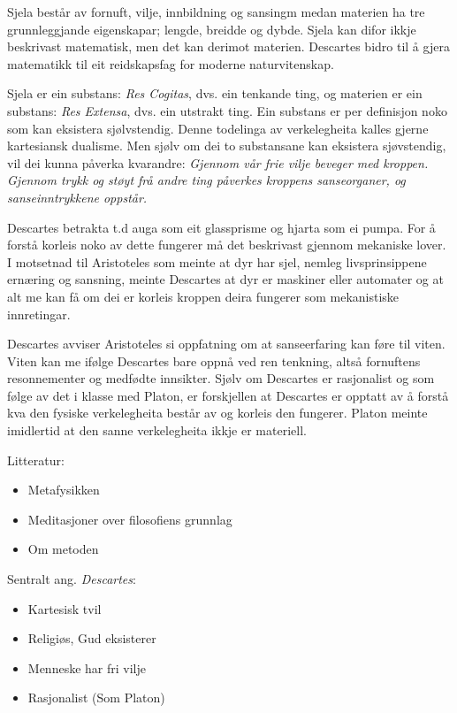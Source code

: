\documentclass[a4paper]{IEEEtran}
\begin{document}
Sjela består av fornuft, vilje, innbildning og sansingm medan materien ha tre grunnleggjande eigenskapar; lengde, breidde og dybde. Sjela kan difor ikkje beskrivast matematisk, men det kan derimot materien. Descartes bidro til å gjera matematikk til eit reidskapsfag for moderne naturvitenskap.\bigskip

Sjela er ein substans: \textit{Res Cogitas}, dvs. ein tenkande ting, og materien er ein substans: \textit{Res Extensa}, dvs. ein utstrakt ting. Ein substans er per definisjon noko som kan eksistera sjølvstendig. Denne todelinga av verkelegheita kalles gjerne kartesiansk dualisme. Men sjølv om dei to substansane kan eksistera sjøvstendig, vil dei kunna påverka kvarandre: \textit{Gjennom vår frie vilje beveger med kroppen. Gjennom trykk og støyt frå andre ting påverkes kroppens sanseorganer, og sanseinntrykkene oppstår.}\bigskip

Descartes betrakta t.d auga som eit glassprisme og hjarta som ei pumpa. For å forstå korleis noko av dette fungerer må det beskrivast gjennom mekaniske lover. I motsetnad til Aristoteles som meinte at dyr har sjel, nemleg livsprinsippene ernæring og sansning, meinte Descartes at dyr er maskiner eller automater og at alt me kan få om dei er korleis kroppen deira fungerer som mekanistiske innretingar.\bigskip

Descartes avviser Aristoteles si oppfatning om at sanseerfaring kan føre til viten. Viten kan me ifølge Descartes bare oppnå ved ren tenkning, altså fornuftens resonnementer og medfødte innsikter. Sjølv om Descartes er rasjonalist og som følge av det i klasse med Platon, er forskjellen at Descartes er opptatt av å forstå kva den fysiske verkelegheita består av og korleis den fungerer. Platon meinte imidlertid at den sanne verkelegheita ikkje er materiell.\bigskip

\begin{center}
Litteratur:
\end{center}
\begin{itemize}
    \item Metafysikken
    \item Meditasjoner over filosofiens grunnlag
    \item Om metoden
\end{itemize}\bigskip 

\begin{center}
Sentralt ang. \textit{Descartes}:
\end{center}
\begin{itemize}\bigskip
    \item Kartesisk tvil
    \item Religiøs, Gud eksisterer
    \item Menneske har fri vilje
    \item Rasjonalist (Som Platon)
\end{itemize}\bigskip
\end{document}
